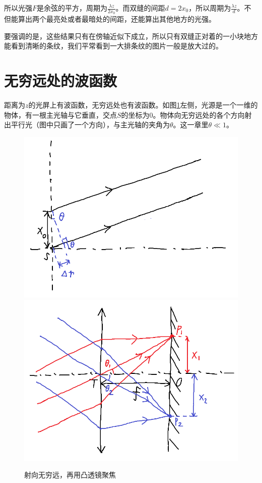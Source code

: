 所以光强$F$是余弦的平方，周期为$\frac{\lambda z}{2 x_0}$。而双缝的间距$d=2 x_0$，所以周期为$\frac{\lambda z}{d}$。不但能算出两个最亮处或者最暗处的间距，还能算出其他地方的光强。

要强调的是，这些结果只有在傍轴近似下成立，所以只有双缝正对着的一小块地方能看到清晰的条纹，我们平常看到一大排条纹的图片一般是放大过的。
\section{无穷远处的波函数}
距离为$z$的光屏上有波函数，无穷远处也有波函数。如图\ref{fig-wave-amp-inf}左侧，光源是一个一维的物体，有一根主光轴与它垂直，交点$S$的坐标为$0$。物体向无穷远处的各个方向射出平行光（图中只画了一个方向），与主光轴的夹角为$\theta$。这一章里$\theta \ll 1$。
\begin{figure}[htb]
\centering
\includegraphics[scale=0.5]{fig/wave-amp-inf}
\includegraphics[scale=0.5]{fig/conv-lens}
\caption{射向无穷远，再用凸透镜聚焦}
\label{fig-wave-amp-inf}
\end{figure}

